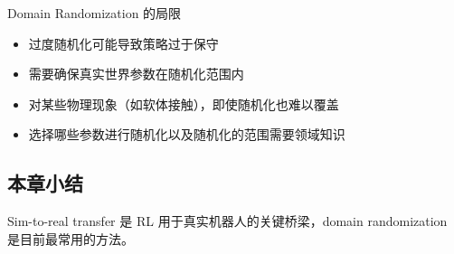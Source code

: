 \begin{warningbox}{Domain Randomization 的局限}
\begin{itemize}
    \item 过度随机化可能导致策略过于保守
    \item 需要确保真实世界参数在随机化范围内
    \item 对某些物理现象（如软体接触），即使随机化也难以覆盖
    \item 选择哪些参数进行随机化以及随机化的范围需要领域知识
\end{itemize}
\end{warningbox}

\subsection{本章小结}

Sim-to-real transfer 是 RL 用于真实机器人的关键桥梁，domain randomization 是目前最常用的方法。

